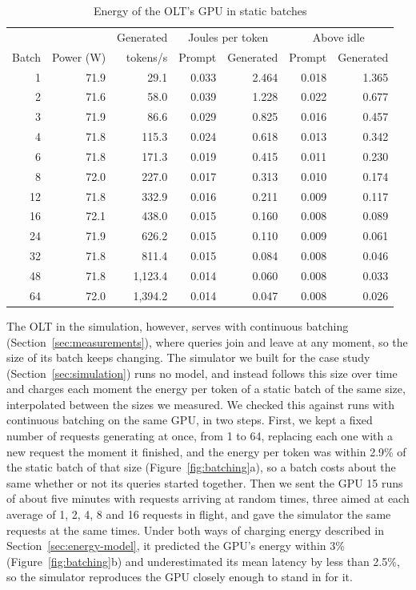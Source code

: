 \documentclass[cic,dipl,english]{infufrgs}
\begin{document}
\begin{table}[htb]
  \centering
  \caption{Energy of the OLT's GPU in static batches}
  \label{tab:olt-sweep}
  \begin{tabular}{rrrrrrr}
    \toprule
    & & Generated & \multicolumn{2}{c}{Joules per token} & \multicolumn{2}{c}{Above idle} \\
    Batch & Power (W) & tokens/s & Prompt & Generated & Prompt & Generated \\
    \midrule
    1 & 71.9 & 29.1 & 0.033 & 2.464 & 0.018 & 1.365 \\
    2 & 71.6 & 58.0 & 0.039 & 1.228 & 0.022 & 0.677 \\
    3 & 71.9 & 86.6 & 0.029 & 0.825 & 0.016 & 0.457 \\
    4 & 71.8 & 115.3 & 0.024 & 0.618 & 0.013 & 0.342 \\
    6 & 71.8 & 171.3 & 0.019 & 0.415 & 0.011 & 0.230 \\
    8 & 72.0 & 227.0 & 0.017 & 0.313 & 0.010 & 0.174 \\
    12 & 71.8 & 332.9 & 0.016 & 0.211 & 0.009 & 0.117 \\
    16 & 72.1 & 438.0 & 0.015 & 0.160 & 0.008 & 0.089 \\
    24 & 71.9 & 626.2 & 0.015 & 0.110 & 0.009 & 0.061 \\
    32 & 71.8 & 811.4 & 0.015 & 0.084 & 0.008 & 0.046 \\
    48 & 71.8 & 1{,}123.4 & 0.014 & 0.060 & 0.008 & 0.033 \\
    64 & 72.0 & 1{,}394.2 & 0.014 & 0.047 & 0.008 & 0.026 \\
    \bottomrule
  \end{tabular}
\end{table}

The OLT in the simulation, however, serves with continuous batching
(Section~\ref{sec:measurements}), where queries join and leave at any moment, so the size
of its batch keeps changing. The simulator we built for the case study
(Section~\ref{sec:simulation}) runs no model, and instead follows this size over time and
charges each moment the energy per token of a static batch of the same size, interpolated
between the sizes we measured.
We checked this against runs with continuous batching on the same GPU, in two steps. First, we kept a fixed number of requests generating at
once, from 1 to 64, replacing each one with a new request the moment it finished, and the
energy per token was within 2.9\% of the static batch of that size
(Figure~\ref{fig:batching}a), so a batch costs about the same
whether or not its queries started together. Then we sent the GPU 15 runs of about five
minutes with requests arriving at random times, three aimed at each average of 1, 2, 4, 8
and 16 requests in flight, and gave the simulator the same requests at the same times.
Under both ways of charging energy described in Section~\ref{sec:energy-model}, it
predicted the GPU's energy within 3\% (Figure~\ref{fig:batching}b) and underestimated its
mean latency by less than 2.5\%, so the simulator reproduces the GPU closely enough to stand
in for it.
\end{document}
